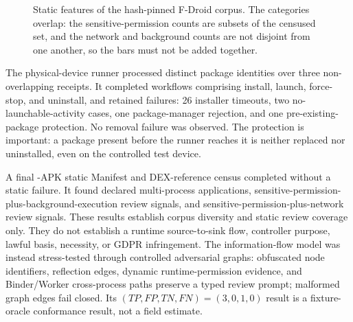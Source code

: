 \begin{figure}[H]
\centering
{}
\caption{Static features of the hash-pinned F-Droid corpus. The categories overlap: the sensitive-permission counts are subsets of the censused set, and the network and background counts are not disjoint from one another, so the bars must not be added together.}
\label{fig:census-composition}
\end{figure}

The physical-device runner processed \DevicePackagesN{} distinct package identities over three non-overlapping receipts. It completed \CompletedWorkflowsN{} workflows comprising install, launch, force-stop, and uninstall, and retained \FailedDeviceWorkflowsN{} failures: 26 installer timeouts, two no-launchable-activity cases, one package-manager rejection, and one pre-existing-package protection. No removal failure was observed. The protection is important: a package present before the runner reaches it is neither replaced nor uninstalled, even on the controlled test device.

A final \FDroidCensusN{}-APK static Manifest and DEX-reference census completed without a static failure. It found \FDroidMultiProcessN{} declared multi-process applications, \FDroidSensitiveBackgroundN{} sensitive-permission-plus-background-execution review signals, and \FDroidSensitiveNetworkN{} sensitive-permission-plus-network review signals. These results establish corpus diversity and static review coverage only. They do not establish a runtime source-to-sink flow, controller purpose, lawful basis, necessity, or GDPR infringement. The information-flow model was instead stress-tested through controlled adversarial graphs: obfuscated node identifiers, reflection edges, dynamic runtime-permission evidence, and Binder/Worker cross-process paths preserve a typed review prompt; malformed graph edges fail closed. Its $(TP,FP,TN,FN)=(3,0,1,0)$ result is a fixture-oracle conformance result, not a field estimate.

